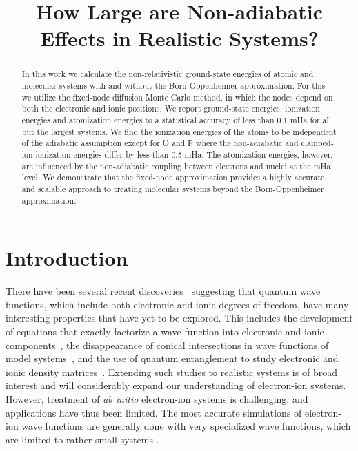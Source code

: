 \documentclass[pra,superscriptaddress,groupedaddress,twocolumn]{revtex4}
\begin{document}
\title{How Large are Non-adiabatic Effects in Realistic Systems?}

\begin{abstract}
In this work we calculate the non-relativistic ground-state energies of atomic and molecular systems with and without the Born-Oppenheimer approximation. For this we utilize the fixed-node diffusion Monte Carlo method, in which the nodes depend on both the electronic and ionic positions. We report ground-state energies, ionization energies and atomization energies to a statistical accuracy of less than $0.1$ mHa for all but the largest systems. We find the ionization energies of the atoms to be independent of the adiabatic assumption except for O and F where the non-adiabatic and clamped-ion ionization energies differ by less than 0.5 mHa. The atomization energies, however, are influenced by the non-adiabatic coupling between electrons and nuclei at the mHa level. We demonstrate that the fixed-node approximation provides a highly accurate and scalable approach to treating molecular systems beyond the Born-Oppenheimer approximation.
\end{abstract}
\maketitle

\section{Introduction}
There have been several recent discoveries~\cite{cederbaum1,gross2014,boent} suggesting that quantum wave functions, which include both electronic and ionic degrees of freedom, have many interesting properties that have yet to be explored.  This includes the development of equations that exactly factorize a wave function into electronic and ionic components~\cite{cederbaum1}, the disappearance of conical intersections in wave functions of model systems~\cite{gross2014}, and the use of quantum entanglement to study electronic and ionic density matrices~\cite{boent}.  Extending such studies to realistic systems is of broad interest and will considerably expand our understanding of electron-ion systems. However, treatment of \textit{ab initio} electron-ion systems is challenging, and applications have thus been limited. The most accurate simulations of electron-ion wave functions are generally done with very specialized wave functions, which are limited to rather small systems \cite{mitroy2013}.  
\end{document}

